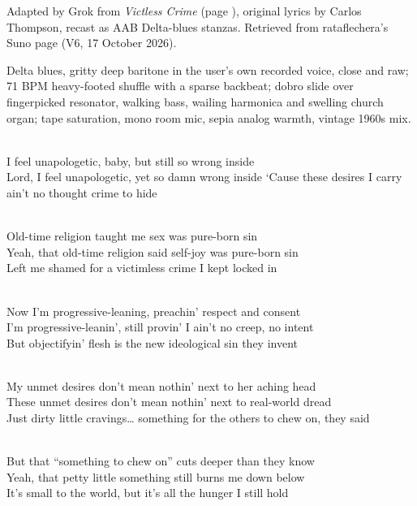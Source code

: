 
\label{sec:something-to-chew-on}
\begin{notes}
Adapted by Grok from \emph{Victless Crime} (page \pageref{sec:victless-crime}), original lyrics by Carlos Thompson, recast as AAB Delta-blues stanzas. Retrieved from rataflechera's Suno page (V6, 17 October 2026).
\end{notes}
\begin{style}
Delta blues, gritty deep baritone in the user's own recorded voice, close and raw; 71 BPM heavy-footed shuffle with a sparse backbeat; dobro slide over fingerpicked resonator, walking bass, wailing harmonica and swelling church organ; tape saturation, mono room mic, sepia analog warmth, vintage 1960s mix.
\end{style}
\begin{lyrics}
\\
I feel unapologetic, baby, but still so wrong inside\\
Lord, I feel unapologetic, yet so damn wrong inside
‘Cause these desires I carry ain’t no thought crime to hide

\\
Old-time religion taught me sex was pure-born sin\\
Yeah, that old-time religion said self-joy was pure-born sin\\
Left me shamed for a victimless crime I kept locked in

\\
Now I’m progressive-leaning, preachin’ respect and consent\\
I’m progressive-leanin’, still provin’ I ain’t no creep, no intent\\
But objectifyin’ flesh is the new ideological sin they invent

\\
My unmet desires don’t mean nothin’ next to her aching head\\
These unmet desires don’t mean nothin’ next to real-world dread\\
Just dirty little cravings… something for the others to chew on, they said

\\
But that “something to chew on” cuts deeper than they know\\
Yeah, that petty little something still burns me down below\\
It’s small to the world, but it’s all the hunger I still hold
\end{lyrics}

